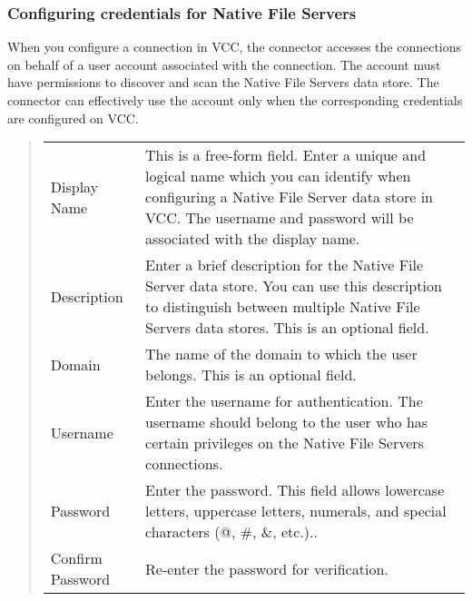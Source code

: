 \documentclass[letterpaper,10pt,english]{sphinxmanual}
\begin{document}
\subsubsection{Configuring credentials for Native File Servers}
\label{\detokenize{mcdmp_app_ug:configuring-credentials-for-native-file-servers}}
When you configure a connection in VCC, the connector accesses the connections on behalf of a user account associated with the connection. The account must have permissions to discover and scan the Native File Servers data store. The connector can effectively use the account only when the corresponding credentials are configured on VCC.

\begin{quote}


\begin{savenotes}\sphinxattablestart
\centering
\begin{tabulary}{\linewidth}[t]{|T|T|}
\hline
{}\relax &\relax \\
\hline
Display Name
&
This is a free-form field. Enter a unique and logical name which
you can identify when configuring a Native File Server data store
in VCC.
The username and password will be associated with the display name.
\\
\hline
Description
&
Enter a brief description for the Native File Server data store. You
can use this description to distinguish between multiple Native File
Servers data stores. This is an optional field.
\\
\hline
Domain
&
The name of the domain to which the user belongs. This is an
optional field.
\\
\hline
Username
&
Enter the username for authentication. The username should belong to
the user who has certain privileges on the Native File Servers
connections.
\\
\hline
Password
&
Enter the password. This field allows lowercase letters, uppercase
letters, numerals, and special characters (@, \#, \&, etc.)..
\\
\hline
Confirm Password
&
Re-enter the password for verification.
\\
\hline
\end{tabulary}
\par
\sphinxattableend\end{savenotes}
\end{quote}
\end{document}
